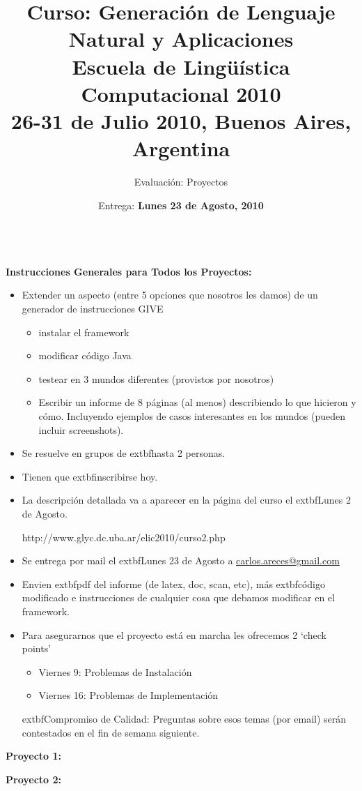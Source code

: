 \documentclass{article}
\title{\textsf{Curso: Generaci\'on de Lenguaje Natural y Aplicaciones}\\
Escuela de Ling\"u\'istica Computacional 2010 \\
26-31 de Julio 2010, Buenos Aires, Argentina\\
}
\author{Evaluaci\'on: Proyectos}
\date{Entrega: \textbf{Lunes 23 de Agosto, 2010}\\
\mbox{    } }
\begin{document}
\maketitle



\textbf{Instrucciones Generales para Todos los Proyectos: } 

\begin{itemize}


\item Extender un aspecto (entre 5 opciones que nosotros les damos) de un generador 
de instrucciones GIVE 
   \begin{itemize}
      \item instalar el framework
      \item modificar c\'odigo Java
      \item testear en 3 mundos diferentes (provistos por nosotros)
      \item Escribir un informe de 8 p\'aginas (al menos) describiendo 
      lo que hicieron y c\'omo.  Incluyendo ejemplos de casos interesantes 
      en los mundos (pueden incluir screenshots). 
   \end{itemize}

\item Se resuelve en grupos de 	extbf{hasta 2 personas}. 

\item Tienen que 	extbf{inscribirse} hoy. 

\item La descripci\'on detallada va a aparecer en la p\'agina del curso el 	extbf{Lunes 2 de Agosto}. 
\medskip
\
\centerline{http://www.glyc.dc.uba.ar/elic2010/curso2.php}
\medskip

\item Se entrega por mail el 	extbf{Lunes 23 de Agosto} a \url{carlos.areces@gmail.com}

\item Envien 	extbf{pdf} del informe (de latex, doc, scan, etc), m\'as 	extbf{c\'odigo modificado} e 
instrucciones de cualquier cosa que debamos modificar en el framework.  

\item Para asegurarnos que el proyecto est\'a en marcha les ofrecemos 2 `check points'
\begin{itemize}
  \item Viernes 9: Problemas de Instalaci\'on
  \item Viernes 16: Problemas de Implementaci\'on
\end{itemize}

	extbf{Compromiso de Calidad:} Preguntas sobre esos temas (por email) ser\'an contestados en el fin 
de semana siguiente. 


\end{itemize}


\medskip
\textbf{Proyecto 1: } 


\medskip
\textbf{Proyecto 2: } 
\end{document}
